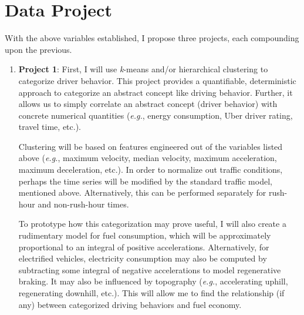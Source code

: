 \documentclass[12pt]{article}
\begin{document}
\section{Data Project}

With the above variables established, I propose three projects, each compounding upon the previous.

\begin{enumerate}

<<<<<<< HEAD
\item \textbf{Project 1}: First, I will use \textit{k}-means and/or hierarchical clustering to categorize driver behavior. This project provides a quantifiable, deterministic approach to categorize an abstract concept like driving behavior. Further, it allows us to simply correlate an abstract concept (driver behavior) with concrete numerical quantities (\textit{e.g.}, energy consumption, Uber driver rating, travel time, etc.).

Clustering will be based on features engineered out of the variables listed above (\textit{e.g.}, maximum velocity, median velocity, maximum acceleration, maximum deceleration, etc.). In order to normalize out traffic conditions, perhaps the time series will be modified by the standard traffic model, mentioned above. Alternatively, this can be performed separately for rush-hour and non-rush-hour times.

To prototype how this categorization may prove useful, I will also create a rudimentary model for fuel consumption, which will be approximately proportional to an integral of positive accelerations. Alternatively, for electrified vehicles, electricity consumption may also be computed by subtracting some integral of negative accelerations to model regenerative braking. It may also be influenced by topography (\textit{e.g.}, accelerating uphill, regenerating downhill, etc.). This will allow me to find the relationship (if any) between categorized driving behaviors and fuel economy.


\end{enumerate}
\end{document}
